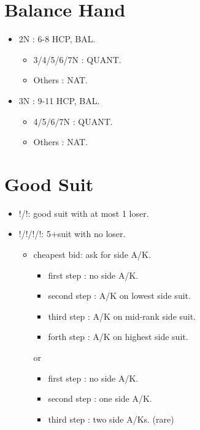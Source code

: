 \documentclass[12pt,twoside,a5paper]{report}%
\begin{document}
	\section*{Balance Hand}
	\begin{itemize}
	\renewcommand{\labelitemi}{}
		\item 2N : 6-8 HCP, BAL.
			\begin{itemize}
			\renewcommand{\labelitemi}{--}
				\item 3/4/5/6/7N : QUANT.
				\item Others : NAT.
			\end{itemize}
		\item 3N : 9-11 HCP, BAL.
			\begin{itemize}
			\renewcommand{\labelitemi}{--}
				\item 4/5/6/7N : QUANT.
				\item Others : NAT.
			\end{itemize}
	\end{itemize}
	\section*{Good Suit}
	\begin{itemize}
	\renewcommand{\labelitemi}{}
		\item {}!/\sp{}!: good suit with at most 1 loser.
		\item {}!/\di{}!/\he{}!/\sp{}!: 5+suit with no loser.
		\begin{itemize}
		\renewcommand{\labelitemi}{--}
		\item cheapest bid: ask for side A/K.
			\begin{itemize}
			\renewcommand{\labelitemi}{--}
				\item first step : no side A/K.
				\item second step : A/K on lowest side suit.
				\item third step : A/K on mid-rank side suit.
				\item forth step : A/K on highest side suit. 
			\end{itemize}
			or
			\begin{itemize}
			\renewcommand{\labelitemi}{--}
				\item first step : no side A/K.
				\item second step : one side A/K.
				\item third step : two side A/Ks. (rare)			
			\end{itemize}
		\end{itemize}
	\end{itemize}
\end{document}
